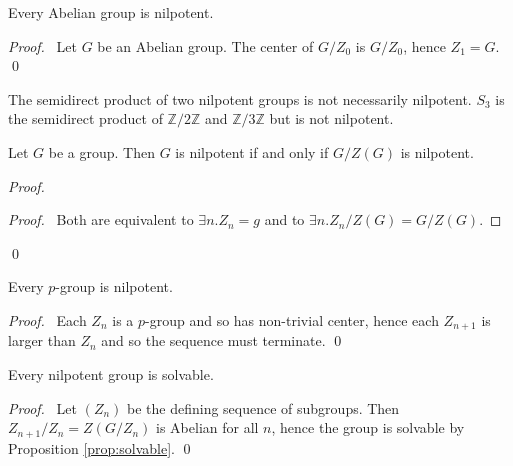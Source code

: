 \begin{prop}
Every Abelian group is nilpotent.
\end{prop}

\begin{proof}
\pf\ Let $G$ be an Abelian group. The center of $G/Z_0$ is $G/Z_0$, hence $Z_1 = G$. \qed
\end{proof}

\begin{ex}
The semidirect product of two nilpotent groups is not necessarily nilpotent. $S_3$ is the semidirect product of $\mathbb{Z} / 2 \mathbb{Z}$ and $\mathbb{Z} / 3 \mathbb{Z}$ but is not nilpotent.
\end{ex}

\begin{prop}
\label{prop:G-over-ZG-nilpotent}
Let $G$ be a group. Then $G$ is nilpotent if and only if $G/Z(G)$ is nilpotent.
\end{prop}

\begin{proof}
\pf
{}
\begin{proof}
	\pf\ Both are equivalent to $\exists n. Z_n = g$ and to $\exists n. Z_n/Z(G) = G/Z(G)$.
\end{proof}
\qed
\end{proof}

\begin{prop}
\label{prop:p-group-nilpotent}
Every $p$-group is nilpotent.
\end{prop}

\begin{proof}
\pf\ Each $Z_n$ is a $p$-group and so has non-trivial center, hence each $Z_{n+1}$ is larger than $Z_n$ and so the sequence must terminate. \qed
\end{proof}

\begin{prop}
Every nilpotent group is solvable.
\end{prop}

\begin{proof}
\pf\ Let $(Z_n)$ be the defining sequence of subgroups. Then $Z_{n+1}/Z_n = Z(G/Z_n)$ is Abelian for all $n$, hence the group is solvable by Proposition \ref{prop:solvable}. \qed
\end{proof}

